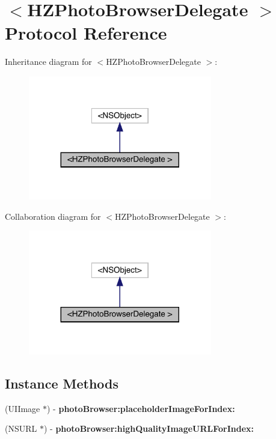 \hypertarget{protocol_h_z_photo_browser_delegate_01-p}{}\section{$<$H\+Z\+Photo\+Browser\+Delegate $>$ Protocol Reference}
\label{protocol_h_z_photo_browser_delegate_01-p}


Inheritance diagram for $<$H\+Z\+Photo\+Browser\+Delegate $>$\+:\nopagebreak
\begin{figure}[H]
\begin{center}
\leavevmode
\includegraphics[width=227pt]{protocol_h_z_photo_browser_delegate_01-p__inherit__graph}
\end{center}
\end{figure}


Collaboration diagram for $<$H\+Z\+Photo\+Browser\+Delegate $>$\+:\nopagebreak
\begin{figure}[H]
\begin{center}
\leavevmode
\includegraphics[width=227pt]{protocol_h_z_photo_browser_delegate_01-p__coll__graph}
\end{center}
\end{figure}
\subsection*{Instance Methods}
\begin{DoxyCompactItemize}
\item 
\mbox{\label{protocol_h_z_photo_browser_delegate_01-p_a62a6ce3f1cad80ace8afde981fe88e28}} 
(U\+I\+Image $\ast$) -\/ {\bfseries photo\+Browser\+:placeholder\+Image\+For\+Index\+:}
\item 
\mbox{\label{protocol_h_z_photo_browser_delegate_01-p_a76b47ff33b9cb594cccd13ce7277e0da}} 
(N\+S\+U\+RL $\ast$) -\/ {\bfseries photo\+Browser\+:high\+Quality\+Image\+U\+R\+L\+For\+Index\+:}
\end{DoxyCompactItemize}


